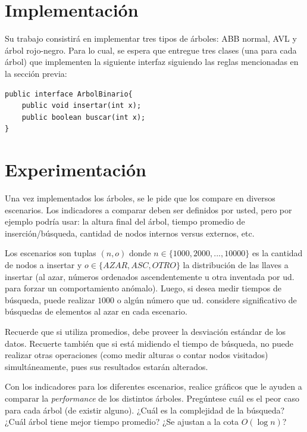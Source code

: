 \documentclass[dcc, usedate]{fcfmcourse}
\begin{document}
\section{Implementación}
Su trabajo consistirá en implementar tres tipos de árboles: ABB normal, AVL y árbol rojo-negro. Para lo cual, se espera que entregue tres clases (una para cada árbol) que implementen la siguiente interfaz siguiendo las reglas mencionadas en la sección previa:
\begin{center}
\begin{lstlisting}
public interface ArbolBinario{
	public void insertar(int x);
	public boolean buscar(int x);
}
\end{lstlisting}
\end{center}

\section{Experimentación}
Una vez implementados los árboles, se le pide que los compare en diversos escenarios. Los indicadores a comparar deben ser definidos por usted, pero por ejemplo podría usar: la altura final del árbol, tiempo promedio de inserción/búsqueda, cantidad de nodos internos versus externos, etc.

Los escenarios son tuplas $(n, o)$ donde $n\in \{1000, 2000, ..., 10000\}$ es la cantidad de nodos a insertar y $o \in \{AZAR, ASC, OTRO\}$ la distribución de las llaves a insertar (al azar, números ordenados ascendentemente u otra inventada por ud. para forzar un comportamiento anómalo). Luego, si desea medir tiempos de búsqueda, puede realizar $1000$ o algún número que ud. considere significativo de búsquedas de elementos al azar en cada escenario.

Recuerde que si utiliza promedios, debe proveer la desviación estándar de los datos. Recuerte también que si está midiendo el tiempo de búsqueda, no puede realizar otras operaciones (como medir alturas o contar nodos visitados) simultáneamente, pues sus resultados estarán alterados.

Con los indicadores para los diferentes escenarios, realice gráficos que le ayuden a comparar la \textit{performance} de los distintos árboles. Pregúntese cuál es el peor caso para cada árbol (de existir alguno). ¿Cuál es la complejidad de la búsqueda? ¿Cuál árbol tiene mejor tiempo promedio? ¿Se ajustan a la cota $O(\log n)$?
\end{document}
